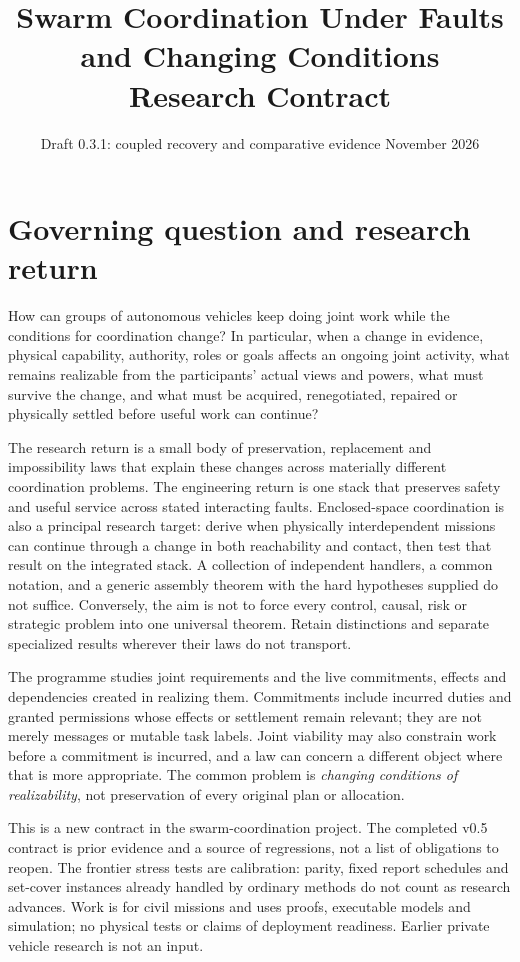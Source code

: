 \documentclass[11pt]{article}
\title{Swarm Coordination Under Faults and Changing Conditions\\Research Contract}
\author{}
\date{Draft 0.3.1: coupled recovery and comparative evidence \quad 24 November 2026}
\begin{document}
\maketitle

\section{Governing question and research return}
How can groups of autonomous vehicles keep doing joint work while the conditions for coordination change? In particular, when a change in evidence, physical capability, authority, roles or goals affects an ongoing joint activity, what remains realizable from the participants' actual views and powers, what must survive the change, and what must be acquired, renegotiated, repaired or physically settled before useful work can continue?

The research return is a small body of preservation, replacement and impossibility laws that explain these changes across materially different coordination problems. The engineering return is one stack that preserves safety and useful service across stated interacting faults. Enclosed-space coordination is also a principal research target: derive when physically interdependent missions can continue through a change in both reachability and contact, then test that result on the integrated stack. A collection of independent handlers, a common notation, and a generic assembly theorem with the hard hypotheses supplied do not suffice. Conversely, the aim is not to force every control, causal, risk or strategic problem into one universal theorem. Retain distinctions and separate specialized results wherever their laws do not transport.

The programme studies joint requirements and the live commitments, effects and dependencies created in realizing them. Commitments include incurred duties and granted permissions whose effects or settlement remain relevant; they are not merely messages or mutable task labels. Joint viability may also constrain work before a commitment is incurred, and a law can concern a different object where that is more appropriate. The common problem is \emph{changing conditions of realizability}, not preservation of every original plan or allocation.

This is a new contract in the swarm-coordination project. The completed v0.5 contract is prior evidence and a source of regressions, not a list of obligations to reopen. The frontier stress tests are calibration: parity, fixed report schedules and set-cover instances already handled by ordinary methods do not count as research advances. Work is for civil missions and uses proofs, executable models and simulation; no physical tests or claims of deployment readiness. Earlier private vehicle research is not an input.
\end{document}
